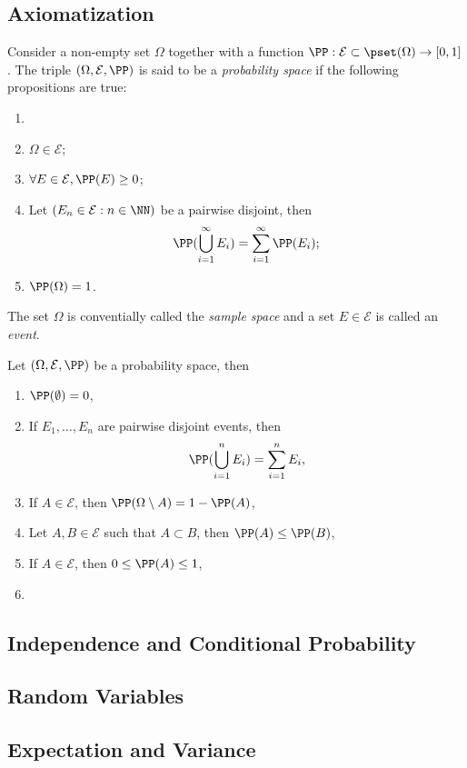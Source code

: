 \subsection{Axiomatization}


\begin{definition}
   Consider a non-empty set $\Omega$ together with a function $\PP : \mathcal{E} \subset \pset(\Omega) \to [0,1]$. The triple $(\Omega, \mathcal{E}, \PP)$ is said to be a \emph{probability space} if the following propositions are true:
   \begin{enumerate}
        \item 
        \item $\Omega \in \mathcal{E}$;
        \item $\forall E \in \mathcal{E}, \PP(E) \geq 0$;
        \item Let $(E_n \in \mathcal{E}: n \in \NN)$ be a pairwise disjoint, then 
        \begin{equation*}
           \PP(\bigcup_{i=1}^\infty E_i) = \sum_{i=1}^\infty \PP(E_i);
       \end{equation*} 
       \item $\PP(\Omega) = 1$.
   \end{enumerate}
   The set $\Omega$ is conventially called the \emph{sample space} and a set $E \in \mathcal{E}$ is called an \emph{event}. 
\end{definition}

\begin{theorem}
Let $(\Omega, \mathcal{E}, \PP)$ be a probability space, then
\begin{enumerate}
    \item $\PP(\emptyset) = 0$,
    \item If $E_1, \ldots, E_n$ are pairwise disjoint events, then 
    \begin{equation*}
        \PP(\bigcup_{i=1}^n E_i) = \sum_{i=1}^n E_i,
    \end{equation*}
    \item If $A \in \mathcal{E}$, then $\PP(\Omega \setminus A) = 1 - \PP(A)$,
    \item Let $A, B \in \mathcal{E}$ such that $A \subset B$, then $\PP(A) \leq \PP(B)$,
    \item If $A \in \mathcal{E}$, then $0 \leq \PP(A) \leq 1$,
    \item 
\end{enumerate} 
\end{theorem}

\subsection{Independence and Conditional Probability}


\subsection{Random Variables}

\subsection{Expectation and Variance}